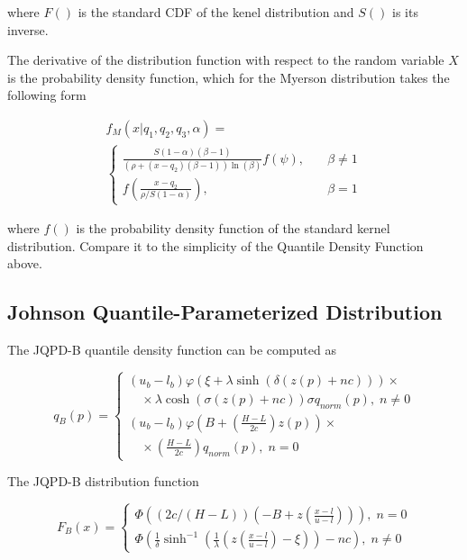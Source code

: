 \documentclass[
  letterpaper,
  DIV=11,
  numbers=noendperiod]{scrartcl}
\begin{document}
where \(F()\) is the standard CDF of the kenel distribution and \(S()\)
is its inverse.

The derivative of the distribution function with respect to the random
variable \(X\) is the probability density function, which for the
Myerson distribution takes the following form

\[
\begin{gathered}
f_M(x\vert q_1, q_2, q_3, \alpha)=\\
\begin{cases}
\frac{S(1-\alpha)(\beta-1)}{(\rho+(x-q_2)(\beta-1))\ln(\beta)}f(\psi), \quad &\beta\neq1\\
f\left(\frac{x-q_2}{\rho/S(1-\alpha)}\right),\quad &\beta=1
\end{cases}
\end{gathered}
\]

where \(f()\) is the probability density function of the standard kernel
distribution. Compare it to the simplicity of the Quantile Density
Function above.

\subsection*{Johnson Quantile-Parameterized
Distribution}\label{johnson-quantile-parameterized-distribution}

The JQPD-B quantile density function can be computed as

\[
q_B(p)=\begin{cases}
(u_b-l_b)\varphi(\xi+\lambda\sinh(\delta(z(p)+nc))) \times\\
\quad \times \lambda\cosh(\sigma(z(p)+nc)) \sigma q_{norm}(p), \; n\neq 0\\
(u_b-l_b)\varphi\left(B+\left(\frac{H-L}{2c}\right)z(p)\right)
\times \\
\quad \times \left(\frac{H-L}{2c}\right)q_{norm}(p), \; n=0
\end{cases}
\]

The JQPD-B distribution function

\[
F_B(x)=\begin{cases}
\Phi\left((2c/(H-L))(-B+z\left(\frac{x-l}{u-l}\right))\right), \; n=0 \\
\Phi\left(\frac{1}{\delta}\sinh^{-1}\left(\frac{1}{\lambda}\left(z\left(\frac{x-l}{u-l}\right)-\xi\right)\right)-nc\right), \; n\neq0
\end{cases}
\]
\end{document}

